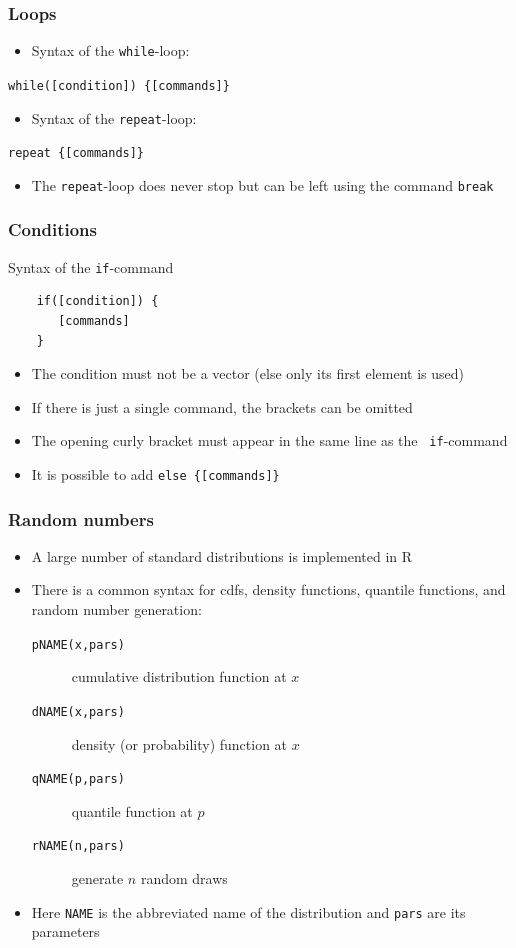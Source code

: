 \documentclass[xcolor={svgnames},10pt,
handout
]{beamer}
\begin{document}
\begin{frame}
\frametitle{Loops}
\begin{itemize}
\item Syntax of the \texttt{while}-loop:
\end{itemize}
\begin{center}
\texttt{while([condition]) \{[commands]\}}
\end{center}
\begin{itemize}
\item Syntax of the \texttt{repeat}-loop:
\end{itemize}
\begin{center}
\texttt{repeat \{[commands]\}}
\end{center}
\begin{itemize}
\item The \texttt{repeat}-loop does never stop but can be left using the
command \texttt{break}
\end{itemize}
\end{frame}


\begin{frame}[fragile]
\frametitle{Conditions}
Syntax of the \texttt{if}-command
\begin{verbatim}
    if([condition]) {
       [commands]
    }
\end{verbatim}
\begin{itemize}
\item The condition must not be a vector
(else only its first element is used)
\item If there is just a single command, the brackets can be omitted
\item The opening curly bracket must appear in the same line as the \texttt{%
if}-command
\item It is possible to add \texttt{else \{[commands]\}}
\end{itemize}
\end{frame}


\begin{frame}
\frametitle{Random numbers}
\begin{itemize}
\item A large number of standard distributions is implemented in R
\item There is a common syntax for cdfs, density functions, quantile
functions, and random number generation:
\begin{description}
\item[\texttt{pNAME(x,pars)}] cumulative distribution function at $x$
\item[\texttt{dNAME(x,pars)}] density (or probability) function at $x$
\item[\texttt{qNAME(p,pars)}] quantile function at $p$
\item[\texttt{rNAME(n,pars)}] generate $n$ random draws
\end{description}
\item Here \texttt{NAME} is the abbreviated name of the distribution and 
\texttt{pars} are its parameters
\end{itemize}
\end{frame}
\end{document}
